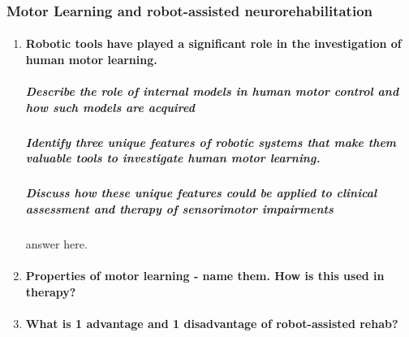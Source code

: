 \documentclass[12pt,article,oneside,a4paper]{memoir}
\begin{document}
\subsubsection{Motor Learning and robot-assisted neurorehabilitation}
\begin{enumerate}
\item \paragraph{Robotic tools have played a significant role in the investigation of human motor learning.}
\subparagraph{Describe the role of internal models in human motor control and how such models are acquired}
\subparagraph{Identify three unique features of robotic systems that make them valuable tools to investigate human motor learning.}
\subparagraph{Discuss how these unique features could be applied to clinical assessment and therapy of sensorimotor impairments} answer here.

\item \paragraph{Properties of motor learning - name them.  How is this used in therapy?}
\item \paragraph{What is 1 advantage and 1 disadvantage of robot-assisted rehab?}
\end{enumerate}

\end{document}
